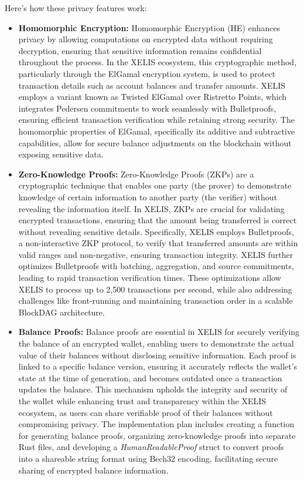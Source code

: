 \documentclass[10pt,a4paper,twocolumn]{article}
\begin{document}
Here's how these privacy features work:
\begin{itemize}
    \item \textbf{Homomorphic Encryption:} Homomorphic Encryption (HE) enhances privacy by allowing computations on encrypted data without requiring decryption, ensuring that sensitive information remains confidential throughout the process. In the XELIS ecosystem, this cryptographic method, particularly through the ElGamal encryption system, is used to protect transaction details such as account balances and transfer amounts. XELIS employs a variant known as Twisted ElGamal over Ristretto Points, which integrates Pedersen commitments to work seamlessly with Bulletproofs, ensuring efficient transaction verification while retaining strong security. The homomorphic properties of ElGamal, specifically its additive and subtractive capabilities, allow for secure balance adjustments on the blockchain without exposing sensitive data.

    \item \textbf{Zero-Knowledge Proofs:} Zero-Knowledge Proofs (ZKPs) are a cryptographic technique that enables one party (the prover) to demonstrate knowledge of certain information to another party (the verifier) without revealing the information itself. In XELIS, ZKPs are crucial for validating encrypted transactions, ensuring that the amount being transferred is correct without revealing sensitive details. Specifically, XELIS employs Bulletproofs, a non-interactive ZKP protocol, to verify that transferred amounts are within valid ranges and non-negative, ensuring transaction integrity. XELIS further optimizes Bulletproofs with batching, aggregation, and source commitments, leading to rapid transaction verification times. These optimizations allow XELIS to process up to 2,500 transactions per second, while also addressing challenges like front-running and maintaining transaction order in a scalable BlockDAG architecture.

    \item \textbf{Balance Proofs:} Balance proofs are essential in XELIS for securely verifying the balance of an encrypted wallet, enabling users to demonstrate the actual value of their balances without disclosing sensitive information. Each proof is linked to a specific balance version, ensuring it accurately reflects the wallet's state at the time of generation, and becomes outdated once a transaction updates the balance. This mechanism upholds the integrity and security of the wallet while enhancing trust and transparency within the XELIS ecosystem, as users can share verifiable proof of their balances without compromising privacy. The implementation plan includes creating a function for generating balance proofs, organizing zero-knowledge proofs into separate Rust files, and developing a \textit{HumanReadableProof} struct to convert proofs into a shareable string format using Bech32 encoding, facilitating secure sharing of encrypted balance information.\\
\end{itemize}
\end{document}
